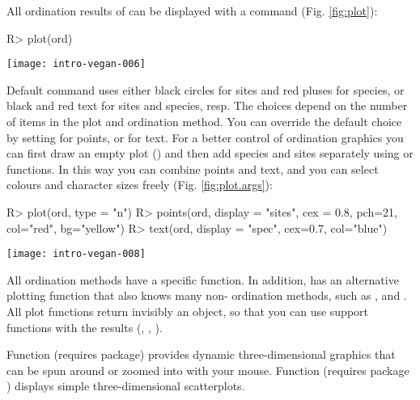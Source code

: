 \documentclass[article,nojss]{jss}
\begin{document}
All ordination results of  can be displayed with a
 command (Fig. \ref{fig:plot}):
\begin{Schunk}
\begin{Sinput}
R> plot(ord)
\end{Sinput}
\end{Schunk}
\begin{SCfigure}
\texttt{[image: intro-vegan-006]}
\caption{Default ordination plot.}
\label{fig:plot}
\end{SCfigure}
Default  command uses either black circles for sites and
red pluses for species, or black and red text for sites and species,
resp.  The choices depend on the number of items in the plot and
ordination method.  You can override the default choice by setting
 for points, or  for text.  For
a better control of ordination graphics you can first draw an empty
plot () and then add species and sites separately
using  or  functions.  In this way you can
combine points and text, and you can select colours and character
sizes freely (Fig. \ref{fig:plot.args}):
\begin{Schunk}
\begin{Sinput}
R> plot(ord, type = "n")
R> points(ord, display = "sites", cex = 0.8, pch=21, col="red", bg="yellow")
R> text(ord, display = "spec", cex=0.7, col="blue")
\end{Sinput}
\end{Schunk}
\begin{SCfigure}
\texttt{[image: intro-vegan-008]}
\caption{A more colourful ordination plot where sites are points, and
  species are text.}
\label{fig:plot.args}
\end{SCfigure}

All  ordination methods have a specific 
function.  In addition,  has an alternative plotting
function  that also knows many non-
ordination methods, such as ,  and
.  All  plot functions return invisibly
an  object, so that you can use 
support functions with the results (, ,
).

Function  (requires  package) provides
dynamic three-dimensional graphics that can be spun around or zoomed
into with your mouse.  Function  (requires package
) displays simple three-dimensional
scatterplots.
\end{document}
